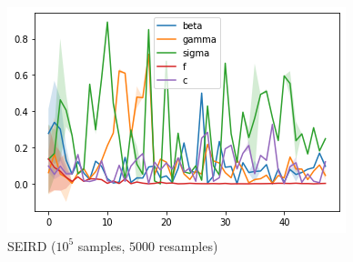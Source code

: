 \documentclass[aspectratio=43]{beamer}
\begin{document}
\begin{frame}
\begin{columns}
\begin{figure}
			\includegraphics[width=\textwidth]{img/seird_meld_7_log.png}
			\caption{SEIRD ($10^5$ samples, $5000$ resamples)}
		\end{figure}
	\end{columns}
\end{frame}
\end{document}
